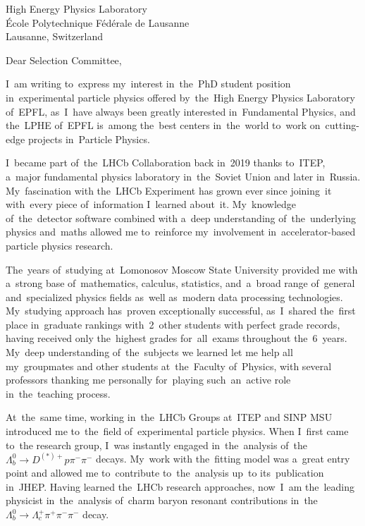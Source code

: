 \documentclass[a4paper]{letter}
\date{\today}
\begin{document}
\begin{letter}{
    High Energy Physics Laboratory \\
    \'{E}cole Polytechnique F\'{e}d\'{e}rale de Lausanne \\
    Lausanne, Switzerland \\
}

    \opening{Dear Selection Committee,}

    \medskip

    I~am writing to~express my~interest in~the~PhD student position 
    in~experimental particle physics offered by~the~High Energy Physics 
    Laboratory of~EPFL, as~I~have always been greatly interested 
    in~Fundamental Physics, and the~LPHE of~EPFL is~among the~best 
    centers in~the~world to~work on~cutting-edge projects in~Particle 
    Physics.

    I~became part of~the~LHCb Collaboration back in~2019 thanks to~ITEP, 
    a~major fundamental physics laboratory in~the~Soviet Union and later 
    in~Russia. My~fascination with the~LHCb Experiment has grown ever 
    since joining~it with~every piece of~information I~learned about~it. 
    My~knowledge of~the~detector software combined with a~deep 
    understanding of~the~underlying physics and~maths allowed me 
    to~reinforce my~involvement in~accelerator-based particle physics 
    research.

    The~years of~studying at~Lomonosov Moscow State University provided 
    me with a~strong base of~mathematics, calculus, statistics, 
    and~a~broad range of~general and~specialized physics fields as~well 
    as~modern data processing technologies.
    My~studying approach has~proven exceptionally successful, 
    as~I~shared the~first place in~graduate rankings with~2~other 
    students with perfect grade records, having received only 
    the~highest grades for~all~exams throughout the~6~years. My~deep 
    understanding of~the~subjects we learned let me help all 
    my~groupmates and other students at~the~Faculty of~Physics, with 
    several professors thanking me personally for~playing such~an~active 
    role in~the~teaching process.

    At~the~same time, working in~the~LHCb Groups at~ITEP and SINP MSU 
    introduced me to~the~field of~experimental particle physics. When 
    I~first came to~the research group, I~was instantly engaged 
    in~the~analysis of~the $\Lambda_b^0\to{D}^{(*)+}p\pi^-\pi^-$ decays.
    My~work with the~fitting model was a~great entry point and allowed 
    me to~contribute to~the~analysis up~to its~publication in~JHEP.
    Having learned the~LHCb research approaches, now~I~am the~leading 
    physicist in~the~analysis of~charm baryon resonant contributions 
    in~the $\Lambda_b^0\to\Lambda_c^+\pi^+\pi^-\pi^-$ decay.


\end{letter}
\end{document}
